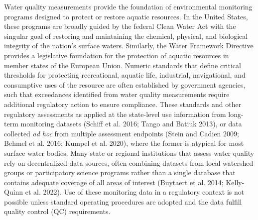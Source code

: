 Water quality measurements provide the foundation of environmental monitoring programs designed to protect or restore aquatic resources. In the United States, these programs are broadly guided by the federal Clean Water Act with the singular goal of restoring and maintaining the chemical, physical, and biological integrity of the nation's surface waters. Similarly, the Water Framework Directive provides a legislative foundation for the protection of aquatic resources in member states of the European Union. Numeric standards that define critical thresholds for protecting recreational, aquatic life, industrial, navigational, and consumptive uses of the resource are often established by government agencies, such that exceedances identified from water quality measurements require additional regulatory action to ensure compliance. These standards and other regulatory assessments as applied at the state-level use information from long-term monitoring datasets (Schiff et al. 2016; Tango and Batiuk 2013), or data collected \emph{ad hoc} from multiple assessment endpoints (Stein and Cadien 2009; Behmel et al. 2016; Kumpel et al. 2020), where the former is atypical for most surface water bodies. Many state or regional institutions that assess water quality rely on decentralized data sources, often combining datasets from local watershed groups or participatory science programs rather than a single database that contains adequate coverage of all areas of interest (Buytaert et al. 2014; Kelly-Quinn et al. 2022). Use of these monitoring data in a regulatory context is not possible unless standard operating procedures are adopted and the data fulfill quality control (QC) requirements.

